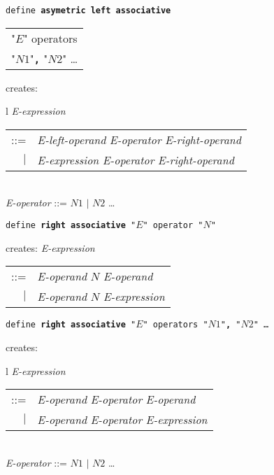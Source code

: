 \documentclass[12pt]{article}
\newcommand{\TT}[1]{{\tt \bfseries #1}}
\newenvironment{indpar}[1][0.3in]%
	{\begin{list}{}%
		     {\setlength{\itemsep}{0in}%
		      \setlength{\topsep}{0in}%
		      \setlength{\parsep}{1ex}%
		      \setlength{\labelwidth}{#1}%
		      \setlength{\leftmargin}{#1}%
		      \addtolength{\leftmargin}{\labelsep}}%
	 \item}%
	{\end{list}}
\begin{document}
\begin{indpar}
{\tt define \TT{asymetric left associative} \begin{tabular}[t]{l}
                                             "$E$" operators \\
					     "$N1$"\TT{,} "$N2$" \ldots \\
					     \end{tabular}}
\begin{indpar}
creates: \begin{tabular}[t]{l}
         {\em E-expression} \begin{tabular}[t]{rl}
                            ::= & {\em E-left-operand} {\em E-operator}
			          {\em E-right-operand} \\
                            $|$ & {\em E-expression} {\em E-operator}
			          {\em E-right-operand} \\
                            \end{tabular} \\
         {\em E-operator} ::= $N1$ $|$ $N2$ \ldots \\
	 \end{tabular}
\end{indpar}

{\tt define \TT{right associative} "$E$" operator "$N$"}
\begin{indpar}
creates: {\em E-expression} \begin{tabular}[t]{rl}
                            ::= & {\em E-operand} $N$ {\em E-operand} \\
                            $|$ & {\em E-operand} $N$ {\em E-expression} \\
                            \end{tabular}
\end{indpar}

{\tt define \TT{right associative} "$E$" operators "$N1$"\TT{,} "$N2$" \ldots}
\begin{indpar}
creates: \begin{tabular}[t]{l}
         {\em E-expression} \begin{tabular}[t]{rl}
                            ::= & {\em E-operand} {\em E-operator}
			          {\em E-operand} \\
                            $|$ & {\em E-operand} {\em E-operator}
			          {\em E-expression} \\
                            \end{tabular} \\
         {\em E-operator} ::= $N1$ $|$ $N2$ \ldots \\
	 \end{tabular}
\end{indpar}


\end{indpar}
\end{document}
